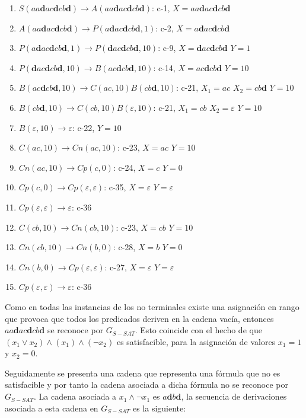 \documentclass[12pt]{article}
\begin{document}
\begin{enumerate}
    \item $S(aa\mathbf{d}ac\mathbf{d}cb\mathbf{d})\to A(aa\mathbf{d}ac\mathbf{d}cb\mathbf{d})$: c-1, $X=aa\mathbf{d}ac\mathbf{d}cb\mathbf{d}$
    \item $A(aa\mathbf{d}ac\mathbf{d}cb\mathbf{d})\to P(a\mathbf{d}ac\mathbf{d}cb\mathbf{d},1)$: c-2, $X=a\mathbf{d}ac\mathbf{d}cb\mathbf{d}$
    \item $P(a\mathbf{d}ac\mathbf{d}cb\mathbf{d},1)\to P(\mathbf{d}ac\mathbf{d}cb\mathbf{d},10)$: c-9, $X=\mathbf{d}ac\mathbf{d}cb\mathbf{d}$ $Y=1$
    \item $P(\mathbf{d}ac\mathbf{d}cb\mathbf{d},10)\to B(ac\mathbf{d}cb\mathbf{d}, 10)$: c-14, $X=ac\mathbf{d}cb\mathbf{d}$ $Y=10$
    \item $B(ac\mathbf{d}cb\mathbf{d}, 10)\to C(ac,10) B(cb\mathbf{d},10)$: c-21, $X_1=ac$ $X_2=cb\mathbf{d}$ $Y=10$
    \item $B(cb\mathbf{d},10)\to C(cb,10) B(\varepsilon,10)$: c-21, $X_1=cb$ $X_2=\varepsilon$ $Y=10$
    \item $B(\varepsilon,10)\to \varepsilon$: c-22, $Y=10$
    \item $C(ac,10)\to Cn(ac,10)$: c-23, $X=ac$ $Y=10$
    \item $Cn(ac,10)\to Cp(c,0)$: c-24, $X=c$ $Y=0$
    \item $Cp(c,0)\to Cp(\varepsilon,\varepsilon)$: c-35, $X=\varepsilon$ $Y=\varepsilon$
    \item $Cp(\varepsilon, \varepsilon) \to \varepsilon$: c-36
    \item $C(cb,10)\to Cn(cb,10)$: c-23, $X=cb$ $Y=10$
    \item $Cn(cb,10)\to Cn(b,0)$: c-28, $X=b$ $Y=0$
    \item $Cn(b,0)\to Cp(\varepsilon,\varepsilon)$: c-27, $X=\varepsilon$ $Y=\varepsilon$
    \item $Cp(\varepsilon, \varepsilon) \to \varepsilon$: c-36
\end{enumerate}

Como en todas las instancias de los no terminales existe una asignación en rango que provoca que todos los predicados deriven en la cadena vacía, entonces $aa\mathbf{d}ac\mathbf{d}cb\mathbf{d}$ se reconoce por $G_{S-SAT}$. Esto coincide con el hecho de que $(x_1 \vee x_2) \wedge (x_1) \wedge (\neg x_2)$ es satisfacible, para la asignación de valores $x_1=1$ y $x_2=0$.

Seguidamente se presenta una cadena que representa una fórmula que no es satisfacible y por tanto la cadena asociada
a dicha fórmula no se reconoce por $G_{S-SAT}$. La cadena asociada a $x_1 \wedge \neg x_1$ es $a\mathbf{d}b\mathbf{d}$,
la secuencia de derivaciones asociada a esta cadena en $G_{S-SAT}$ es la siguiente:
\end{document}
